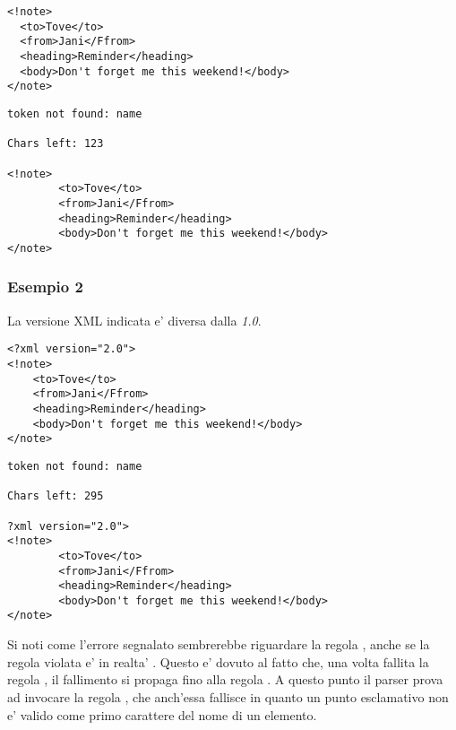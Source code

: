 \documentclass[italian,a4paper]{article}
\begin{document}
\begin{mdframed}[frametitle=Input]
\begin{verbatim}
<!note>
  <to>Tove</to>
  <from>Jani</Ffrom>
  <heading>Reminder</heading>
  <body>Don't forget me this weekend!</body>
</note>
\end{verbatim}
\end{mdframed}

\begin{mdframed}[frametitle=Output]
\begin{verbatim}
token not found: name

Chars left: 123

<!note>
        <to>Tove</to>
        <from>Jani</Ffrom>
        <heading>Reminder</heading>
        <body>Don't forget me this weekend!</body>
</note>
\end{verbatim}
\end{mdframed}

\subsubsection{Esempio 2}

La versione XML indicata e' diversa dalla \emph{1.0}.

\begin{mdframed}[frametitle=Input]
\begin{verbatim}
<?xml version="2.0">
<!note>
	<to>Tove</to>
	<from>Jani</Ffrom>
	<heading>Reminder</heading>
	<body>Don't forget me this weekend!</body>
</note>
\end{verbatim}
\end{mdframed}

\begin{mdframed}[frametitle=Output]
\begin{verbatim}
token not found: name

Chars left: 295

?xml version="2.0">
<!note>                                                   
        <to>Tove</to>                                     
        <from>Jani</Ffrom>                                
        <heading>Reminder</heading>                       
        <body>Don't forget me this weekend!</body>        
</note>
\end{verbatim}
\end{mdframed}

Si noti come l'errore segnalato sembrerebbe riguardare la regola ,
anche se la regola violata e' in realta' . Questo e'
dovuto al fatto che, una volta fallita la regola , il
fallimento si propaga fino alla regola . A questo punto il
parser prova ad invocare la regola , che anch'essa fallisce in
quanto un punto esclamativo non e' valido come primo carattere del nome di un
elemento.
\end{document}
